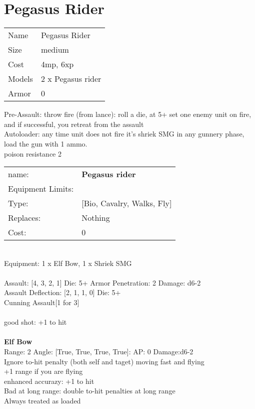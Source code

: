 \pagebreak\pagebreak

\section{ Pegasus Rider }

\begin{tabular}{ll}
  Name & Pegasus Rider \\
  Size & medium\\
  Cost & 4mp, 6xp\\
  Models & 2 x Pegasus rider\\
  Armor & 0\\
\end{tabular}

\noindent Pre-Assault: throw fire (from lance): roll a die, at 5+ set one enemy unit on fire, and if successful, you retreat from the assault\\ 
Autoloader: any time unit does not fire it's shriek SMG in any gunnery phase, load the gun with 1 ammo.\\ 
poison resistance 2\\ 


\noindent
\begin{tabular}{ll}
name: &{\bf Pegasus rider } \\
Equipment Limits: & \\
Type: &[Bio, Cavalry, Walks, Fly] \\
Replaces: &Nothing \\
Cost: & 0\\
\end{tabular}
\ \\
Equipment: 1 x Elf Bow, 1 x Shriek SMG \\
\ \\
Assault: [4, 3, 2, 1] Die: 5+ Armor Penetration: 2 Damage: d6-2 \\
Assault Deflection: [2, 1, 1, 0] Die: 5+\\
\indent Cunning Assault[1 for 3]\\ 
 
\ \\
good shot: +1 to hit\\ 

\ \\
{\bf Elf Bow } \\



Range: 2  Angle: [True, True, True, True]: AP: 0 Damage:d6-2 \\
Ignore to-hit penalty (both self and taget) moving fast and flying\\ 
+1 range if you are flying\\ 
enhanced accurazy: +1 to hit\\ 
Bad at long range: double to-hit penalties at long range\\ 
Always treated as loaded\\ 




